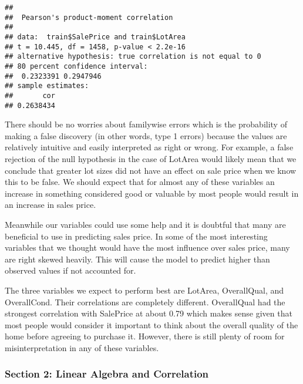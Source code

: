 \documentclass[
]{article}
\newenvironment{Shaded}{\begin{snugshade}}{\end{snugshade}}
\newcommand{\KeywordTok}[1]{\textcolor[rgb]{0.13,0.29,0.53}{\textbf{#1}}}
\newcommand{\NormalTok}[1]{#1}
\newcommand{\OperatorTok}[1]{\textcolor[rgb]{0.81,0.36,0.00}{\textbf{#1}}}
\newcommand{\StringTok}[1]{\textcolor[rgb]{0.31,0.60,0.02}{#1}}
\begin{document}
\begin{verbatim}
## 
##  Pearson's product-moment correlation
## 
## data:  train$SalePrice and train$LotArea
## t = 10.445, df = 1458, p-value < 2.2e-16
## alternative hypothesis: true correlation is not equal to 0
## 80 percent confidence interval:
##  0.2323391 0.2947946
## sample estimates:
##       cor 
## 0.2638434
\end{verbatim}

There should be no worries about familywise errors which is the
probability of making a false discovery (in other words, type 1 errors)
because the values are relatively intuitive and easily interpreted as
right or wrong. For example, a false rejection of the null hypothesis in
the case of LotArea would likely mean that we conclude that greater lot
sizes did not have an effect on sale price when we know this to be
false. We should expect that for almost any of these variables an
increase in something considered good or valuable by most people would
result in an increase in sales price.

Meanwhile our variables could use some help and it is doubtful that many
are beneficial to use in predicting sales price. In some of the most
interesting variables that we thought would have the most influence over
sales price, many are right skewed heavily. This will cause the model to
predict higher than observed values if not accounted for.

The three variables we expect to perform best are LotArea, OverallQual,
and OverallCond. Their correlations are completely different.
OverallQual had the strongest correlation with SalePrice at about 0.79
which makes sense given that most people would consider it important to
think about the overall quality of the home before agreeing to purchase
it. However, there is still plenty of room for misinterpretation in any
of these variables.

\hypertarget{section-2-linear-algebra-and-correlation}{%
\subsubsection{Section 2: Linear Algebra and
Correlation}\label{section-2-linear-algebra-and-correlation}}

\begin{Shaded}
\end{Shaded}
\end{document}
